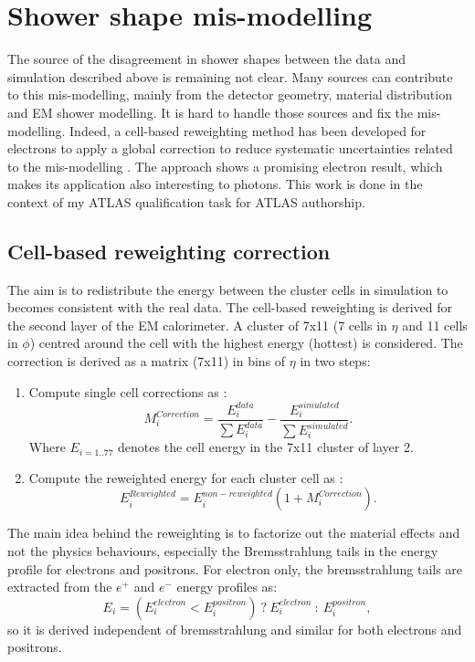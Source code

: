 \section{Shower shape mis-modelling}
\label{gamma:ss}
The source of the disagreement in shower shapes between the data and simulation described above is remaining not clear. Many sources can contribute to this mis-modelling, mainly from the detector geometry, material distribution and EM shower modelling. It is hard to handle those sources and fix the mis-modelling. Indeed, a cell-based reweighting method has been developed for electrons to apply a global correction to reduce systematic uncertainties related to the mis-modelling \cite{xu, khandoga}. The approach shows a promising electron result, which makes its application also interesting to photons. This work is done in the context of my ATLAS qualification task for ATLAS authorship.

\subsection{Cell-based reweighting correction}
\label{gamma:ss:reweighting}
The aim is to redistribute the energy between the cluster cells in simulation to becomes consistent with the real data. The cell-based reweighting is derived for the second layer of the EM calorimeter. A cluster of 7x11 (7 cells in $\eta$ and 11 cells in $\phi$) centred around the cell with the highest energy (hottest) is considered. The correction is derived as a matrix (7x11) in bins of $\eta$ in two steps:
\begin{enumerate}
    \item Compute single cell corrections as : 
    \begin{equation}
        M_{i}^{Correction} = \frac{E_{i}^{data}}{\sum E_{i}^{data}} -  \frac{E_{i}^{simulated}}{\sum E_{i}^{simulated}}.
    \end{equation}
    Where $E_{i = 1.. 77}$ denotes the cell energy in the 7x11 cluster of layer 2. 
    \item Compute the reweighted energy for each cluster cell as : 
    \begin{equation}
        E_{i}^{Reweighted} = E_{i}^{non-reweighted}(1+M_{i}^{Correction}).
    \end{equation}
\end{enumerate}
The main idea behind the reweighting is to factorize out the material effects and not the physics behaviours, especially the Bremsstrahlung tails in the energy profile for electrons and positrons. For electron only, the bremsstrahlung tails are extracted from the $e^+$ and $e^-$ energy profiles as: 
\begin{equation}
    E_{i} = (E_{i}^{electron} <  E_{i}^{positron}) \ ? \ E_{i}^{electron} \ : \  E_{i}^{positron},
\end{equation}
so it is derived independent of bremsstrahlung and similar for both electrons and positrons.

